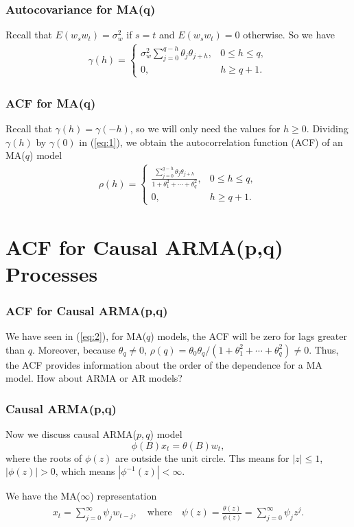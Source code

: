 \documentclass[%
xcolor=pdftex]{beamer}
\begin{document}
\begin{frame}
\frametitle{Autocovariance for MA(q)}

Recall that $E(w_s w_t) = \sigma^2_w$ if $s=t$ and $E(w_s
w_t)=0$ otherwise. So we have
\begin{eqnarray}\label{eq:1}
\gamma(h) = \left \{ \begin{array}{ll}
\sigma^2_w \sum^{q-h}_{j=0} \theta_j \theta_{j+h}, & 0 \le h\le q, \\
0, & h \ge q+1.
\end{array} \right.
\end{eqnarray}


\end{frame}

\begin{frame}
\frametitle{ACF for MA(q)}

Recall that $\gamma(h)=\gamma(-h)$, so we will only need the
values for $h\ge 0$. Dividing $\gamma(h)$ by $\gamma(0)$ in
(\ref{eq:1}), we obtain the autocorrelation function (ACF) of
an MA($q$) model
\begin{eqnarray}\label{eq:2}
\rho(h) = \left \{ \begin{array}{ll}
\frac{\sum^{q-h}_{j=0} \theta_j \theta_{j+h}}{1+\theta^2_1+\cdots+\theta^2_q}, & 0 \le h\le q, \\
0, & h \ge q+1.
\end{array} \right.
\end{eqnarray}


\end{frame}

\section{ACF for Causal ARMA(p,q) Processes}
\frame{\tableofcontents[currentsection]}

\begin{frame}
\frametitle{ACF for Causal ARMA(p,q)}

We have seen in (\ref{eq:2}), for MA($q$) models, the ACF will
be zero for lags greater than $q$. Moreover, because
$\theta_q\ne 0$,
$\rho(q)=\theta_0\theta_q/(1+\theta_1^2+\cdots+\theta^2_q)\ne
0$. Thus, the ACF provides information
about the order of the dependence for a MA model. How about
ARMA or AR models?

\end{frame}

\begin{frame}
\frametitle{Causal ARMA(p,q)}

Now we discuss causal ARMA($p,q$) model
$$
\phi(B) x_t = \theta(B) w_t,
$$
where the roots of $\phi(z)$ are outside the unit circle. Ths means for $|z| \le 1$, $|\phi(z)| > 0$, which means $|\phi^{-1}(z)| < \infty$. 
\newline

We have the MA($\infty$) representation
\begin{eqnarray}\label{eq:3}
x_t = \sum^\infty_{j=0} \psi_j w_{t-j},  \quad \mbox{where} \quad
\psi(z) = \frac{\theta(z)}{\phi(z)} = \sum^\infty_{j=0} \psi_j z^j.
\end{eqnarray}

\end{frame}
\end{document}
